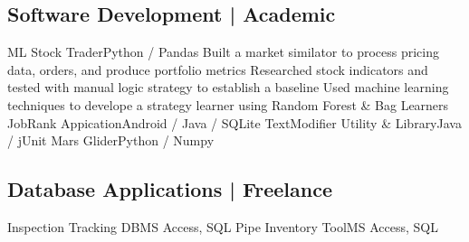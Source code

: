 \subsection{Software Development | Academic}
\justifiedsubsection
{ML Stock Trader}{}{Python / Pandas}
\workitems
{Built a market similator to process pricing data, orders, and produce portfolio metrics}
{Researched stock indicators and tested with manual logic strategy to establish a baseline}
{Used machine learning techniques to develope a strategy learner using Random Forest \& Bag Learners}
%
\justifiedsubsection
{JobRank Appication}{}{Android / Java / SQLite}
%
\justifiedsubsection
{TextModifier Utility \& Library}{}{Java / jUnit}
%
\justifiedsubsection
{Mars Glider}{}{Python / Numpy}
%
%
\subsection{Database Applications | Freelance}
\justifiedsubsection
{Inspection Tracking DB}{}{MS Access, SQL}
\justifiedsubsection
{Pipe Inventory Tool}{}{MS Access, SQL}
